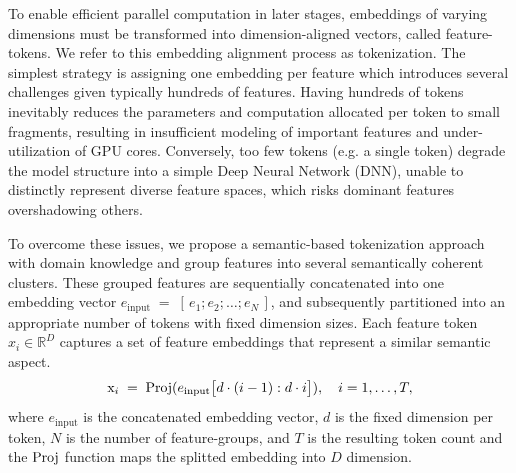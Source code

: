 To enable efficient parallel computation in later stages, embeddings of varying dimensions must be transformed into dimension-aligned vectors, called feature-tokens. We refer to this embedding alignment process as tokenization. The simplest strategy is assigning one embedding per feature which introduces several challenges given typically hundreds of features. Having hundreds of tokens inevitably reduces the parameters and computation allocated per token to small fragments, resulting in insufficient modeling of important features and under-utilization of GPU cores. Conversely, too few tokens (e.g. a single token) degrade the model structure into a simple Deep Neural Network (DNN), unable to distinctly represent diverse feature spaces, which risks dominant features overshadowing others.

To overcome these issues, we propose a semantic-based tokenization approach with domain knowledge and group features into several semantically coherent clusters. These grouped features are sequentially concatenated into one embedding vector $e_{\text{input}} \;=\; [\,e_{1}; e_{2}; \dots; e_{N}\,]$, and subsequently partitioned into an appropriate number of tokens with fixed dimension sizes. Each feature token $x_i \in \mathbb{R}^{D}$ captures a set of feature embeddings that represent a similar semantic aspect. 
\begin{equation}
  \newline
  \text{x}_{i} \;=\; {\rm Proj}(e_{\text{input}}\bigl[d\cdot(i-1) : d\cdot i\bigr]),
  \quad i = 1,\dots,T,
  \label{eq:tokenization}
\end{equation}
where \(e_{\text{input}}\) is the concatenated embedding vector,
\(d\) is the fixed dimension per token, \(N\) is the number of
feature-groups, and \(T\) is the resulting token count and the ${\rm Proj}$ function maps the splitted embedding into $D$ dimension.
    
